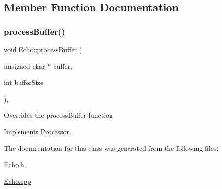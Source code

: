 \subsection{Member Function Documentation}
\mbox{\label{classEcho_ae915d9d4065a34411d18791a5ae9006b}} 
\subsubsection{\texorpdfstring{process\+Buffer()}{processBuffer()}}
{\footnotesize\ttfamily void Echo\+::process\+Buffer (\begin{DoxyParamCaption}\item[{unsigned char $\ast$}]{buffer,  }\item[{int}]{buffer\+Size }\end{DoxyParamCaption})\hspace{0.3cm}{\ttfamily [override]}, {\ttfamily [virtual]}}

Overrides the process\+Buffer function 

Implements \hyperlink{classProcessor_a401e57b59e43de9c4a51ca0f566d2948}{Processor}.



The documentation for this class was generated from the following files\+:\begin{DoxyCompactItemize}
\item 
\hyperlink{Echo_8h}{Echo.\+h}\item 
\hyperlink{Echo_8cpp}{Echo.\+cpp}\end{DoxyCompactItemize}
